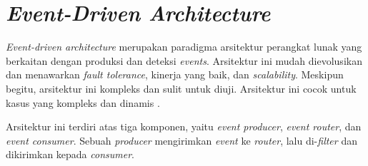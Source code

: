 \section{\textit{Event-Driven Architecture}}

\textit{Event-driven architecture} merupakan paradigma arsitektur perangkat lunak yang berkaitan dengan produksi dan deteksi \textit{events}. Arsitektur ini mudah dievolusikan dan menawarkan \textit{fault tolerance}, kinerja yang baik, dan \textit{scalability}. Meskipun begitu, arsitektur ini kompleks dan sulit untuk diuji. Arsitektur ini cocok untuk kasus yang kompleks dan dinamis \parencite{softwareArchitecture}.

Arsitektur ini terdiri atas tiga komponen, yaitu \textit{event producer}, \textit{event router}, dan \textit{event consumer}. Sebuah \textit{producer} mengirimkan \textit{event} ke \textit{router}, lalu di-\textit{filter} dan dikirimkan kepada \textit{consumer}.

